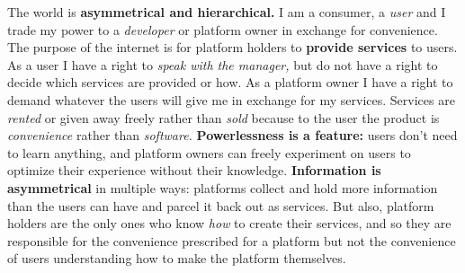 The world is \textbf{asymmetrical and hierarchical.} I am a consumer, a
\emph{user} and I trade my power to a \emph{developer} or platform owner
in exchange for convenience. The purpose of the internet is for platform
holders to \textbf{provide services} to users. As a user I have a right
to \emph{speak with the manager,} but do not have a right to decide
which services are provided or how. As a platform owner I have a right
to demand whatever the users will give me in exchange for my services.
Services are \emph{rented} or given away freely
rather than \emph{sold} because to the user the product is
\emph{convenience} rather than \emph{software.} \textbf{Powerlessness is
a feature:} users don't need to learn anything, and platform owners can
freely experiment on users to optimize their experience without their
knowledge. \textbf{Information is asymmetrical} in multiple ways:
platforms collect and hold more information than the users can have and
parcel it back out as services. But also, platform holders are the only
ones who know \emph{how} to create their services, and so they are
responsible for the convenience prescribed for a platform but not the
convenience of users understanding how to make the platform themselves.

